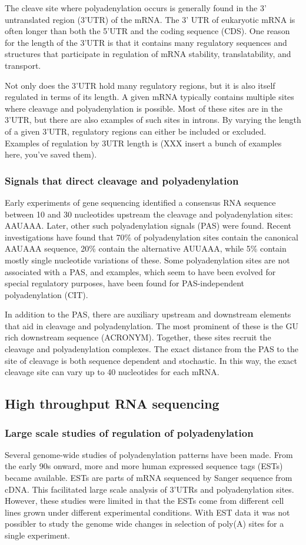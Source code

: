 The cleave site where polyadenylation occurs is generally found in the 3'
untranslated region (3'UTR) of the mRNA. The 3' UTR of eukaryotic mRNA is often
longer than both the 5'UTR and the coding sequence (CDS). One reason for the
length of the 3'UTR is that it contains many regulatory sequences and
structures that participate in regulation of mRNA stability, translatability,
and transport.

Not only does the 3'UTR hold many regulatory regions, but it is also itself
regulated in terms of its length. A given mRNA typically contains multiple
sites where cleavage and polyadenylation is possible. Most of these sites are
in the 3'UTR, but there are also examples of such sites in introns. By varying
the length of a given 3'UTR, regulatory regions can either be included or
excluded. Examples of regulation by 3UTR length is (XXX insert a bunch of
examples here, you've saved them).

\subsubsection{Signals that direct cleavage and polyadenylation}
Early experiments of gene sequencing identified a consensus RNA sequence
between 10 and 30 nucleotides upstream the cleavage and polyadenylation sites:
AAUAAA. Later, other such polyadenylation signals (PAS) were found. Recent
investigations have found that 70\% of polyadenylation sites contain the
canonical AAUAAA sequence, 20\% contain the alternative AUUAAA, while 5\%
contain mostly single nucleotide variations of these. Some polyadenylation
sites are not associated with a PAS, and examples, which seem to have been
evolved for special regulatory purposes, have been found for
PAS-independent polyadenylation (CIT).

In addition to the PAS, there are auxiliary upstream and downstream elements
that aid in cleavage and polyadenylation. The most prominent of these is the GU
rich downstream sequence (ACRONYM). Together, these sites recruit the cleavage
and polyadenylation complexes. The exact distance from the PAS to the site of
cleavage is both sequence dependent and stochastic. In this way, the exact
cleavage site can vary up to 40 nucleotides for each mRNA.

\subsection{High throughput RNA sequencing}
\subsubsection{Large scale studies of regulation of polyadenylation}
Several genome-wide studies of polyadenylation patterns have been made. From
the early 90s onward, more and more human expressed sequence tags (ESTs) became
available. ESTs are parts of mRNA sequenced by Sanger sequence from cDNA. This
facilitated large scale analysis of 3'UTRs and polyadenylation sites. However,
these studies were limited in that the ESTs come from different cell lines
grown under different experimental conditions. With EST data it was not
possibler to study the genome wide changes in selection of poly(A) sites for a
single experiment.

